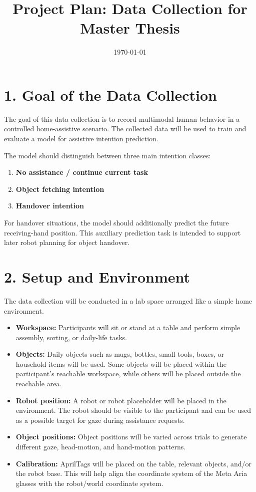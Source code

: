 \documentclass[11pt,a4paper]{article}
\title{\textbf{Project Plan: Data Collection for Master Thesis}}
\date{\today}
\begin{document}
\maketitle

\section*{1. Goal of the Data Collection}

The goal of this data collection is to record multimodal human behavior in a controlled home-assistive scenario. The collected data will be used to train and evaluate a model for assistive intention prediction.

The model should distinguish between three main intention classes:
\begin{enumerate}[label=\arabic*.]
    \item \textbf{No assistance / continue current task}
    \item \textbf{Object fetching intention}
    \item \textbf{Handover intention}
\end{enumerate}

For handover situations, the model should additionally predict the future receiving-hand position. This auxiliary prediction task is intended to support later robot planning for object handover.

\section*{2. Setup and Environment}

The data collection will be conducted in a lab space arranged like a simple home environment.

\begin{itemize}
    \item \textbf{Workspace:} Participants will sit or stand at a table and perform simple assembly, sorting, or daily-life tasks.
    
    \item \textbf{Objects:} Daily objects such as mugs, bottles, small tools, boxes, or household items will be used. Some objects will be placed within the participant's reachable workspace, while others will be placed outside the reachable area.
    
    \item \textbf{Robot position:} A robot or robot placeholder will be placed in the environment. The robot should be visible to the participant and can be used as a possible target for gaze during assistance requests.
    
    \item \textbf{Object positions:} Object positions will be varied across trials to generate different gaze, head-motion, and hand-motion patterns.
    
    \item \textbf{Calibration:} AprilTags will be placed on the table, relevant objects, and/or the robot base. This will help align the coordinate system of the Meta Aria glasses with the robot/world coordinate system.
\end{itemize}
\end{document}

